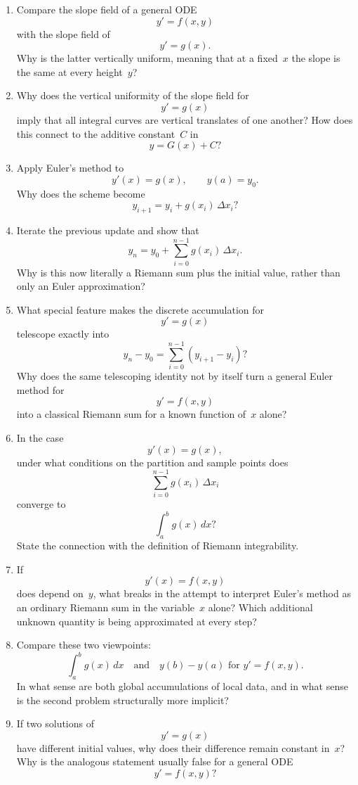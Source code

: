 \begin{enumerate}
    \[ y'(x)=g(x) \]
    of the form
    \[ y(x)=G(x)+C? \]
    How does the initial condition
    \[ y(a)=y_{0} \]
    determine the value of~\(C\)?
  \item Compare the slope field of a general ODE
    \[ y'=f(x,y) \]
    with the slope field of
    \[ y'=g(x). \]
    Why is the latter vertically uniform, meaning that at a fixed~\(x\) the slope is the same at every height~\(y\)?
  \item Why does the vertical uniformity of the slope field for
    \[ y'=g(x) \]
    imply that all integral curves are vertical translates of one another? How does this connect to the additive constant~\(C\) in
    \[ y=G(x)+C? \]
  \item Apply Euler's method to
    \[ y'(x)=g(x), \qquad y(a)=y_{0}. \]
    Why does the scheme become
    \[ y_{i+1}=y_{i}+g(x_{i})\,\Delta x_{i}? \]
  \item Iterate the previous update and show that
    \[ y_{n} = y_{0}+\sum_{i=0}^{n-1}g(x_{i})\,\Delta x_{i}. \]
    Why is this now literally a Riemann sum plus the initial value, rather than only an Euler approximation?
  \item What special feature makes the discrete accumulation for
    \[ y'=g(x) \]
    telescope exactly into
    \[ y_{n}-y_{0}=\sum_{i=0}^{n-1}(y_{i+1}-y_{i})? \]
    Why does the same telescoping identity not by itself turn a general Euler method for
    \[ y'=f(x,y) \]
    into a classical Riemann sum for a known function of~\(x\) alone?
  \item In the case
    \[ y'(x)=g(x), \]
    under what conditions on the partition and sample points does
    \[ \sum_{i=0}^{n-1}g(x_{i})\,\Delta x_{i} \]
    converge to
    \[ \int_{a}^{b} g(x)\,dx? \]
    State the connection with the definition of Riemann integrability.
  \item If
    \[ y'(x)=f(x,y) \]
    does depend on~\(y\), what breaks in the attempt to interpret Euler's method as an ordinary Riemann sum in the variable~\(x\) alone? Which additional unknown quantity is being approximated at every step?
  \item Compare these two viewpoints:
    \[ \int_{a}^{b} g(x)\,dx \quad \text{and}\quad y(b)-y(a) \text{ for }y'=f(x,y). \]
    In what sense are both global accumulations of local data, and in what sense is the second problem structurally more implicit?
  \item If two solutions of
    \[ y'=g(x) \]
    have different initial values, why does their difference remain constant in~\(x\)? Why is the analogous statement usually false for a general ODE
    \[ y'=f(x,y)? \]
\end{enumerate}
